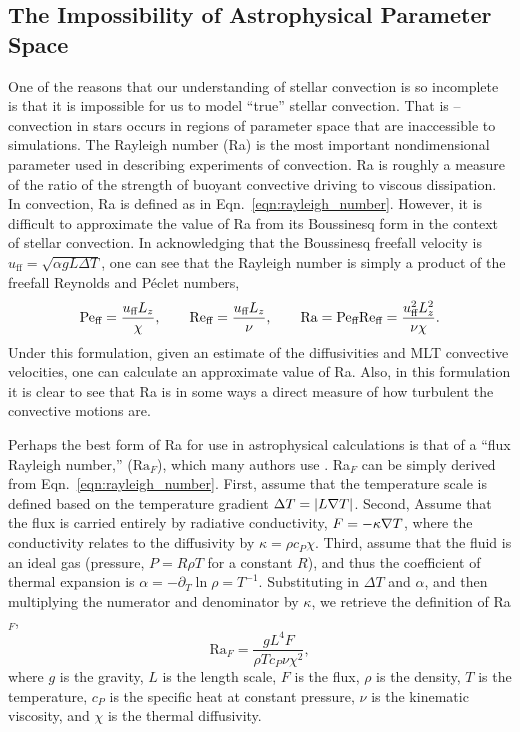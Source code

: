 \subsection{The Impossibility of Astrophysical Parameter Space}
\label{sct:nondimensional_parameters}
One of the reasons that our understanding of stellar convection is so incomplete is that it is impossible for us to model ``true'' stellar convection.
That is -- convection in stars occurs in regions of parameter space that are inaccessible to simulations.
The Rayleigh number (Ra) is the most important nondimensional parameter used in describing experiments of convection.
Ra is roughly a measure of the ratio of the strength of buoyant convective driving to viscous dissipation.
In \RB convection, Ra is defined as in Eqn.~\ref{eqn:rayleigh_number}.
However, it is difficult to approximate the value of Ra from its Boussinesq form in the context of stellar convection.
In acknowledging that the Boussinesq freefall velocity is $u_{\text{ff}} = \sqrt{\alpha g L \Delta T}$, one can see that the Rayleigh number is simply a product of the freefall Reynolds and P\'{e}clet numbers,
\begin{equation}
\text{Pe}_{\text{ff}} = \frac{u_{\text{ff}} L_z}{\chi}, \qquad
\text{Re}_{\text{ff}} = \frac{u_{\text{ff}} L_z}{\nu},  \qquad
\text{Ra} = \text{Pe}_{\text{ff}}\text{Re}_{\text{ff}} = \frac{u_{\text{ff}}^2 L_z^2}{\nu\chi}.
\end{equation}
Under this formulation, given an estimate of the diffusivities and MLT convective velocities, one can calculate an approximate value of Ra.
Also, in this formulation it is clear to see that Ra is in some ways a direct measure of how turbulent the convective motions are.

Perhaps the best form of Ra for use in astrophysical calculations is that of a ``flux Rayleigh number,'' ($\text{Ra}_F$), which many authors use \citep[e.g.,][]{featherstone&hindman2016a}.
Ra$_F$ can be simply derived from Eqn.~\ref{eqn:rayleigh_number}.
First, assume that the temperature scale is defined based on the temperature gradient $\Delta T = |L \nabla T|$.
Second, Assume that the flux is carried entirely by radiative conductivity, $F = -\kappa \nabla T$, where the conductivity relates to the diffusivity by $\kappa = \rho c_P \chi$.
Third, assume that the fluid is an ideal gas (pressure, $P = R\rho T$ for a constant $R$), and thus the coefficient of thermal expansion is $\alpha = -\partial_T \ln\rho  = T^{-1}$.
Substituting in $\Delta T$ and $\alpha$, and then multiplying the numerator and denominator by $\kappa$, we retrieve the definition of Ra$_F$,
\begin{equation}
\text{Ra}_F = \frac{g L^4 F}{\rho T c_P \nu \chi^2},
\end{equation}
where $g$ is the gravity, $L$ is the length scale, $F$ is the flux, $\rho$ is the density, $T$ is the temperature, $c_P$ is the specific heat at constant pressure, $\nu$ is the kinematic viscosity, and $\chi$ is the thermal diffusivity.

